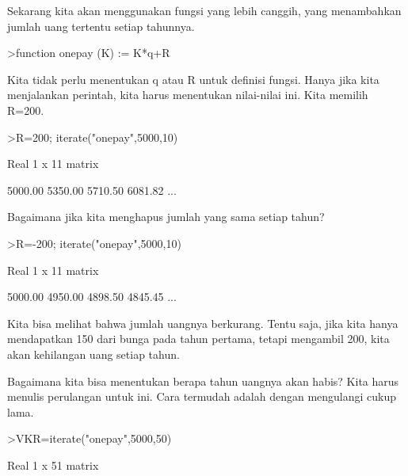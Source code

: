 \documentclass[a4paper,10pt]{article}
\begin{document}
\begin{eulernotebook}
\begin{eulercomment}
\begin{eulercomment}
\begin{eulercomment}
\begin{eulercomment}
\begin{eulercomment}
\begin{eulercomment}
\begin{eulercomment}
\begin{eulercomment}
\begin{eulercomment}
\begin{eulercomment}
\begin{eulercomment}
\begin{eulercomment}
\begin{eulercomment}
Sekarang kita akan menggunakan fungsi yang lebih canggih, yang
menambahkan jumlah uang tertentu setiap tahunnya.
\end{eulercomment}
\begin{eulerprompt}
>function onepay (K) := K*q+R
\end{eulerprompt}
\begin{eulercomment}
Kita tidak perlu menentukan q atau R untuk definisi fungsi. Hanya jika
kita menjalankan perintah, kita harus menentukan nilai-nilai ini. Kita
memilih R=200.
\end{eulercomment}
\begin{eulerprompt}
>R=200; iterate("onepay",5000,10)
\end{eulerprompt}
\begin{euleroutput}
  Real 1 x 11 matrix
  
      5000.00     5350.00     5710.50     6081.82     ...
\end{euleroutput}
\begin{eulercomment}
Bagaimana jika kita menghapus jumlah yang sama setiap tahun?
\end{eulercomment}
\begin{eulerprompt}
>R=-200; iterate("onepay",5000,10)
\end{eulerprompt}
\begin{euleroutput}
  Real 1 x 11 matrix
  
      5000.00     4950.00     4898.50     4845.45     ...
\end{euleroutput}
\begin{eulercomment}
Kita bisa melihat bahwa jumlah uangnya berkurang. Tentu saja, jika
kita hanya mendapatkan 150 dari bunga pada tahun pertama, tetapi
mengambil 200, kita akan kehilangan uang setiap tahun.

Bagaimana kita bisa menentukan berapa tahun uangnya akan habis? Kita
harus menulis perulangan untuk ini. Cara termudah adalah dengan
mengulangi cukup lama.
\end{eulercomment}
\begin{eulerprompt}
>VKR=iterate("onepay",5000,50)
\end{eulerprompt}
\begin{euleroutput}
  Real 1 x 51 matrix
  

\end{euleroutput}
\end{eulercomment}
\end{eulercomment}
\end{eulercomment}
\end{eulercomment}
\end{eulercomment}
\end{eulercomment}
\end{eulercomment}
\end{eulercomment}
\end{eulercomment}
\end{eulercomment}
\end{eulercomment}
\end{eulercomment}
\end{eulernotebook}
\end{document}
